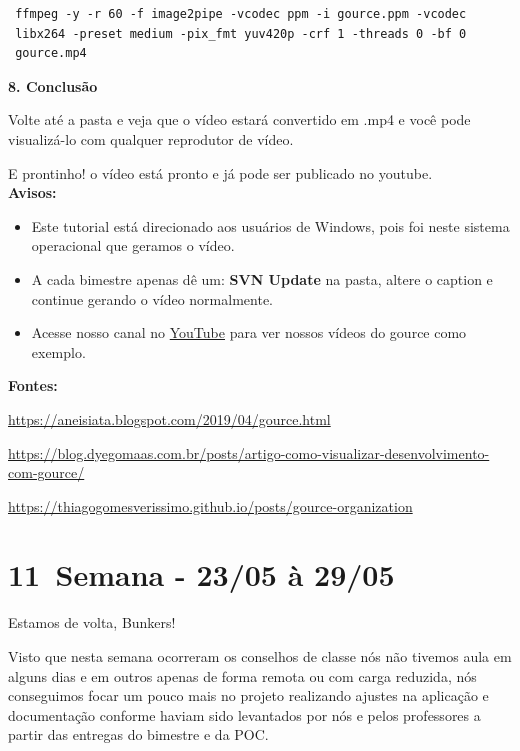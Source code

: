 \lstset{language=Fortran,
             basicstyle=\ttfamily\small,
             showstringspaces=false
    }
        \begin{lstlisting} 
 ffmpeg -y -r 60 -f image2pipe -vcodec ppm -i gource.ppm -vcodec 
 libx264 -preset medium -pix_fmt yuv420p -crf 1 -threads 0 -bf 0 
 gource.mp4
        \end{lstlisting} 

\textbf{8. Conclusão}

Volte até a pasta e veja que o vídeo estará convertido em .mp4 e você pode visualizá-lo com qualquer reprodutor de vídeo.

E prontinho! o vídeo está pronto e já pode ser publicado no \gls{youtube}. \\

\textbf{Avisos:}
\begin{itemize}
    \item Este tutorial está direcionado aos usuários de Windows, pois foi neste sistema operacional que geramos o vídeo. 
    \item A cada bimestre apenas dê um: \textbf{SVN Update} na pasta, altere o caption e continue gerando o vídeo normalmente.
    \item Acesse nosso canal no \href{https://www.youtube.com/channel/UCOJVZlclPTqngZQwPS9Fvpg/featured}{YouTube} para ver nossos vídeos do \gls{gource} como exemplo.
\end{itemize}

\textbf{Fontes:}

\noindent\href{https://aneisiata.blogspot.com/2019/04/gource.html}{https://aneisiata.blogspot.com/2019/04/gource.html}

\noindent\href{https://blog.dyegomaas.com.br/posts/artigo-como-visualizar-desenvolvimento-com-gource/}{https://blog.dyegomaas.com.br/posts/artigo-como-visualizar-desenvolvimento-com-gource/}

\noindent\href{https://thiagogomesverissimo.github.io/posts/gource-organization}{https://thiagogomesverissimo.github.io/posts/gource-organization}


\section{11\textordfeminine \, Semana - 23/05 à 29/05}
Estamos de volta, Bunkers!

Visto que nesta semana ocorreram os conselhos de classe nós não tivemos aula em alguns dias e em outros apenas de forma remota ou com carga reduzida, nós conseguimos focar um pouco mais no projeto realizando ajustes na aplicação e documentação conforme haviam sido levantados por nós e pelos professores a partir das entregas do bimestre e da \acs{POC}.

